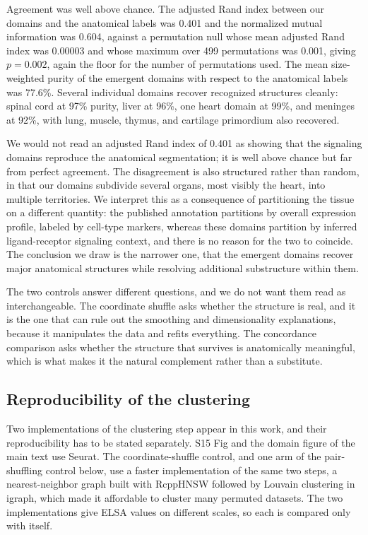 \documentclass[10pt]{article}
\begin{document}
Agreement was well above chance. The adjusted Rand index between our domains and the anatomical labels was 0.401 and the normalized mutual information was 0.604, against a permutation null whose mean adjusted Rand index was 0.00003 and whose maximum over 499 permutations was 0.001, giving $p = 0.002$, again the floor for the number of permutations used. The mean size-weighted purity of the emergent domains with respect to the anatomical labels was 77.6\%. Several individual domains recover recognized structures cleanly: spinal cord at 97\% purity, liver at 96\%, one heart domain at 99\%, and meninges at 92\%, with lung, muscle, thymus, and cartilage primordium also recovered.

We would not read an adjusted Rand index of 0.401 as showing that the signaling domains reproduce the anatomical segmentation; it is well above chance but far from perfect agreement. The disagreement is also structured rather than random, in that our domains subdivide several organs, most visibly the heart, into multiple territories. We interpret this as a consequence of partitioning the tissue on a different quantity: the published annotation partitions by overall expression profile, labeled by cell-type markers, whereas these domains partition by inferred ligand-receptor signaling context, and there is no reason for the two to coincide. The conclusion we draw is the narrower one, that the emergent domains recover major anatomical structures while resolving additional substructure within them.

The two controls answer different questions, and we do not want them read as interchangeable. The coordinate shuffle asks whether the structure is real, and it is the one that can rule out the smoothing and dimensionality explanations, because it manipulates the data and refits everything. The concordance comparison asks whether the structure that survives is anatomically meaningful, which is what makes it the natural complement rather than a substitute.

\subsection*{Reproducibility of the clustering}

Two implementations of the clustering step appear in this work, and their reproducibility has to be stated separately. S15 Fig and the domain figure of the main text use Seurat. The coordinate-shuffle control, and one arm of the pair-shuffling control below, use a faster implementation of the same two steps, a nearest-neighbor graph built with RcppHNSW followed by Louvain clustering in igraph, which made it affordable to cluster many permuted datasets. The two implementations give ELSA values on different scales, so each is compared only with itself.
\end{document}
